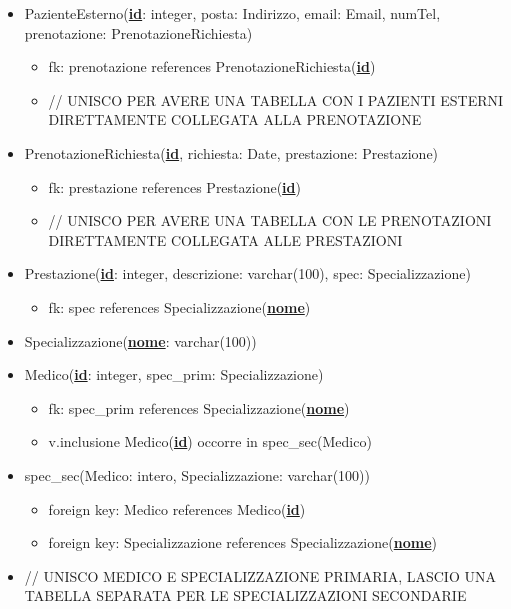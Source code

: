 \documentclass[12pt, letterpaper]{article}
\begin{document}
\begin{itemize}
    \item PazienteEsterno(\underline{\textbf{id}}: integer, posta: Indirizzo, email: Email, numTel, prenotazione: PrenotazioneRichiesta)
    \begin{itemize}
        \item fk: prenotazione references PrenotazioneRichiesta(\underline{\textbf{id}})
        \item // UNISCO PER AVERE UNA TABELLA CON I PAZIENTI ESTERNI DIRETTAMENTE COLLEGATA ALLA PRENOTAZIONE
    \end{itemize}
    \item PrenotazioneRichiesta(\underline{\textbf{id}}, richiesta: Date, prestazione: Prestazione)
    \begin{itemize}
        \item fk: prestazione references Prestazione(\underline{\textbf{id}})
        \item // UNISCO PER AVERE UNA TABELLA CON LE PRENOTAZIONI DIRETTAMENTE COLLEGATA ALLE PRESTAZIONI
    \end{itemize}
    \item Prestazione(\underline{\textbf{id}}: integer, descrizione: varchar(100), spec: Specializzazione)
    \begin{itemize}
        \item fk: spec references Specializzazione(\underline{\textbf{nome}})
    \end{itemize}
    \item Specializzazione(\underline{\textbf{nome}}: varchar(100))
    \item Medico(\underline{\textbf{id}}: integer, spec\_prim: Specializzazione)
    \begin{itemize}
        \item fk: spec\_prim references Specializzazione(\underline{\textbf{nome}})
        \item v.inclusione Medico(\underline{\textbf{id}}) occorre in spec\_sec(Medico)
    \end{itemize}
    \item spec\_sec(Medico: intero, Specializzazione: varchar(100))
    \begin{itemize}
        \item foreign key: Medico references Medico(\underline{\textbf{id}})
        \item foreign key: Specializzazione references Specializzazione(\underline{\textbf{nome}})
    \end{itemize}
    \item // UNISCO MEDICO E SPECIALIZZAZIONE PRIMARIA, LASCIO UNA TABELLA SEPARATA PER LE SPECIALIZZAZIONI SECONDARIE
\end{itemize}
\newpage
\end{document}
